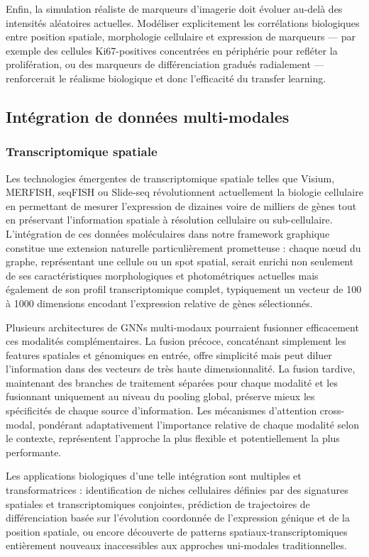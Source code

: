 Enfin, la simulation réaliste de marqueurs d'imagerie doit évoluer au-delà des intensités aléatoires actuelles. Modéliser explicitement les corrélations biologiques entre position spatiale, morphologie cellulaire et expression de marqueurs — par exemple des cellules Ki67-positives concentrées en périphérie pour refléter la prolifération, ou des marqueurs de différenciation gradués radialement — renforcerait le réalisme biologique et donc l'efficacité du transfer learning.

\subsection{Intégration de données multi-modales}

\subsubsection{Transcriptomique spatiale}

Les technologies émergentes de transcriptomique spatiale telles que Visium, MERFISH, seqFISH ou Slide-seq révolutionnent actuellement la biologie cellulaire en permettant de mesurer l'expression de dizaines voire de milliers de gènes tout en préservant l'information spatiale à résolution cellulaire ou sub-cellulaire. L'intégration de ces données moléculaires dans notre framework graphique constitue une extension naturelle particulièrement prometteuse : chaque nœud du graphe, représentant une cellule ou un spot spatial, serait enrichi non seulement de ses caractéristiques morphologiques et photométriques actuelles mais également de son profil transcriptomique complet, typiquement un vecteur de 100 à 1000 dimensions encodant l'expression relative de gènes sélectionnés.

Plusieurs architectures de GNNs multi-modaux pourraient fusionner efficacement ces modalités complémentaires. La fusion précoce, concaténant simplement les features spatiales et génomiques en entrée, offre simplicité mais peut diluer l'information dans des vecteurs de très haute dimensionnalité. La fusion tardive, maintenant des branches de traitement séparées pour chaque modalité et les fusionnant uniquement au niveau du pooling global, préserve mieux les spécificités de chaque source d'information. Les mécanismes d'attention cross-modal, pondérant adaptativement l'importance relative de chaque modalité selon le contexte, représentent l'approche la plus flexible et potentiellement la plus performante.

Les applications biologiques d'une telle intégration sont multiples et transformatrices : identification de niches cellulaires définies par des signatures spatiales et transcriptomiques conjointes, prédiction de trajectoires de différenciation basée sur l'évolution coordonnée de l'expression génique et de la position spatiale, ou encore découverte de patterns spatiaux-transcriptomiques entièrement nouveaux inaccessibles aux approches uni-modales traditionnelles.

